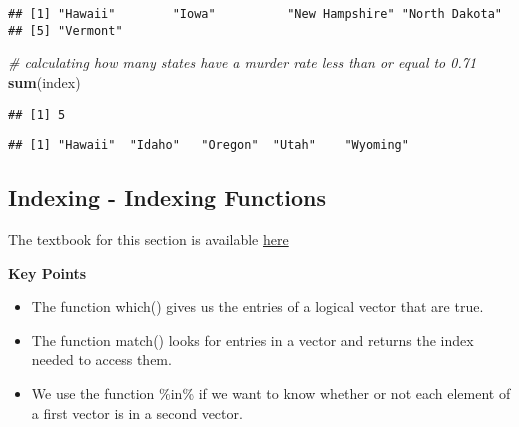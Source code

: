 \documentclass[]{article}
\newenvironment{Shaded}{\begin{snugshade}}{\end{snugshade}}
\newcommand{\CommentTok}[1]{\textcolor[rgb]{0.56,0.35,0.01}{\textit{#1}}}
\newcommand{\DecValTok}[1]{\textcolor[rgb]{0.00,0.00,0.81}{#1}}
\newcommand{\KeywordTok}[1]{\textcolor[rgb]{0.13,0.29,0.53}{\textbf{#1}}}
\newcommand{\NormalTok}[1]{#1}
\newcommand{\OperatorTok}[1]{\textcolor[rgb]{0.81,0.36,0.00}{\textbf{#1}}}
\newcommand{\StringTok}[1]{\textcolor[rgb]{0.31,0.60,0.02}{#1}}
\providecommand{\tightlist}{%
  \setlength{\itemsep}{0pt}\setlength{\parskip}{0pt}}
\begin{document}
\begin{verbatim}
## [1] "Hawaii"        "Iowa"          "New Hampshire" "North Dakota" 
## [5] "Vermont"
\end{verbatim}

\begin{Shaded}
\begin{Highlighting}[]
\CommentTok{# calculating how many states have a murder rate less than or equal to 0.71}
\KeywordTok{sum}\NormalTok{(index)}
\end{Highlighting}
\end{Shaded}

\begin{verbatim}
## [1] 5
\end{verbatim}

\begin{Shaded}
\end{Shaded}

\begin{verbatim}
## [1] "Hawaii"  "Idaho"   "Oregon"  "Utah"    "Wyoming"
\end{verbatim}

\hypertarget{indexing---indexing-functions}{%
\subsection{Indexing - Indexing
Functions}\label{indexing---indexing-functions}}

The textbook for this section is available
\href{https://rafalab.github.io/dsbook/r-basics.html\#which}{here}

\textbf{Key Points}

\begin{itemize}
\tightlist
\item
  The function which() gives us the entries of a logical vector that are
  true.
\item
  The function match() looks for entries in a vector and returns the
  index needed to access them.
\item
  We use the function \%in\% if we want to know whether or not each
  element of a first vector is in a second vector.
\end{itemize}
\end{document}
